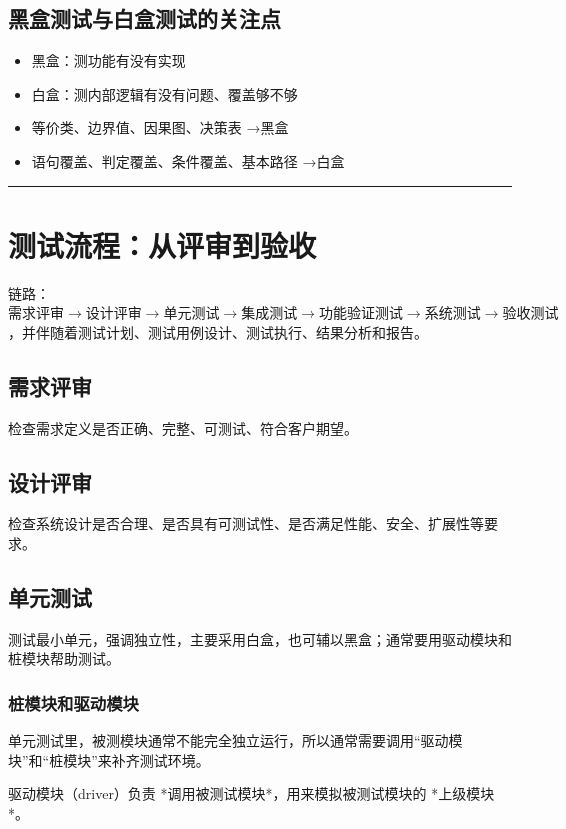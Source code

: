 \documentclass[11pt]{article}
\begin{document}
\subsection{黑盒测试与白盒测试的关注点}
\label{sec:org3af611e}

\begin{itemize}
\item 黑盒：测功能有没有实现
\item 白盒：测内部逻辑有没有问题、覆盖够不够
\end{itemize}


\begin{itemize}
\item 等价类、边界值、因果图、决策表 →黑盒
\item 语句覆盖、判定覆盖、条件覆盖、基本路径 →白盒
\end{itemize}


\noindent\rule{\textwidth}{0.5pt}
\section{测试流程：从评审到验收}
\label{sec:orgec25b2b}
链路：\(需求评审 \rightarrow 设计评审 \rightarrow 单元测试 \rightarrow 集成测试 \rightarrow 功能验证测试 \rightarrow 系统测试 \rightarrow 验收测试\)，并伴随着测试计划、测试用例设计、测试执行、结果分析和报告。
\subsection{需求评审}
\label{sec:org4840f7e}
检查需求定义是否正确、完整、可测试、符合客户期望。
\subsection{设计评审}
\label{sec:org104c323}
检查系统设计是否合理、是否具有可测试性、是否满足性能、安全、扩展性等要求。
\subsection{单元测试}
\label{sec:org8ccf3fa}
测试最小单元，强调独立性，主要采用白盒，也可辅以黑盒；通常要用驱动模块和桩模块帮助测试。
\subsubsection{桩模块和驱动模块}
\label{sec:org094cbb0}
单元测试里，被测模块通常不能完全独立运行，所以通常需要调用“驱动模块”和“桩模块”来补齐测试环境。

驱动模块（driver）负责 *调用被测试模块*，用来模拟被测试模块的 *上级模块*。
\end{document}
